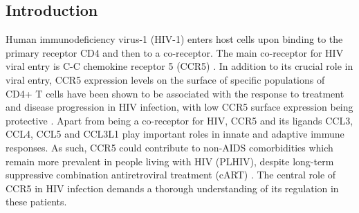 \documentclass{book}
\begin{document}
\begin{refsection}
\clearpage
\newpage
\section*{Introduction}
Human immunodeficiency virus-1 (HIV-1) enters host cells upon binding to the primary receptor CD4 and then to a co-receptor.
The main co-receptor for HIV viral entry is C-C chemokine receptor 5 (CCR5) \cite{Brelot2018CCR5}.
In addition to its crucial role in viral entry, CCR5 expression levels on the surface of specific populations of CD4+ T cells have been shown to be associated with the response to treatment and disease progression in HIV infection, with low CCR5 surface expression being protective \cite{Gervaix2002Response}.
Apart from being a co-receptor for HIV, CCR5 and its ligands CCL3, CCL4, CCL5 and CCL3L1 play important roles in innate and adaptive immune responses.
As such, CCR5 could contribute to non-AIDS comorbidities which remain more prevalent in people living with HIV (PLHIV), despite long-term suppressive combination antiretroviral treatment (cART) \cite{van2007HowWill}.
The central role of CCR5 in HIV infection demands a thorough understanding of its regulation in these patients.


\end{refsection}
\end{document}
